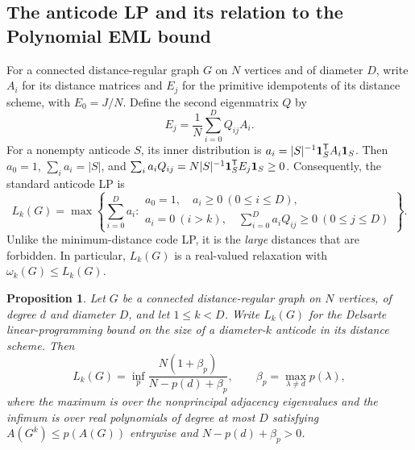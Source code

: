 \documentclass[10pt,a4paper]{article}
\theoremstyle{plain}
\newtheorem{proposition}[theorem]{Proposition}
\numberwithin{equation}{section}
\def\1{\mbox{\boldmath $1$}}
\begin{document}
\subsection{The anticode LP and its relation to the Polynomial EML bound}
For a connected distance-regular graph $G$ on $N$ vertices and of diameter $D$, write $A_i$ for its distance matrices and $E_j$ for the primitive idempotents of its distance scheme, with $E_0=J/N$. Define the second eigenmatrix $Q$ by
\[
 E_j=\frac1N\sum_{i=0}^{D}Q_{ij}A_i.
\]
For a nonempty anticode $S$, its inner distribution is
$a_i=|S|^{-1}\1_S^{\mathsf T}A_i\1_S$. Then $a_0=1$,
$\sum_i a_i=|S|$, and
$\sum_i a_iQ_{ij}=N|S|^{-1}\1_S^{\mathsf T}E_j\1_S\ge0$.
Consequently, the standard anticode LP is~\cite{Delsarte_1973,Tanaka_2012}
\begin{equation}\label{eq:coding-primal}
 L_k(G)=\max\left\{\sum_{i=0}^{D}a_i:
 \begin{array}{l}
 a_0=1,\quad a_i\ge0\ (0\le i\le D),\\
 a_i=0\ (i>k),\quad
 \sum_{i=0}^{D}a_iQ_{ij}\ge0\ (0\le j\le D)
 \end{array}\right\}.
\end{equation}
Unlike the minimum-distance code LP, it is the \emph{large} distances that are forbidden. In particular, $L_k(G)$ is a real-valued relaxation with $\omega_k(G)\le L_k(G)$.%


\begin{proposition}\label{prop:coding-delsarte}
Let $G$ be a connected distance-regular graph on $N$ vertices, of degree $d$ and diameter $D$, and let $1\le k<D$. Write $L_k(G)$ for the Delsarte linear-programming bound on the size of a diameter-$k$ anticode in its distance scheme. Then
\begin{equation}\label{eq:coding-delsarte}
 L_k(G)=\inf_p
 \frac{N(1+\beta_p)}{N-p(d)+\beta_p},
 \qquad
 \beta_p=\max_{\lambda\ne d}p(\lambda),
\end{equation}
where the maximum is over the nonprincipal adjacency eigenvalues and the infimum is over real polynomials of degree at most $D$ satisfying
$A(G^k)\le p(A(G))$ entrywise and $N-p(d)+\beta_p>0$.
\end{proposition}
\end{document}
